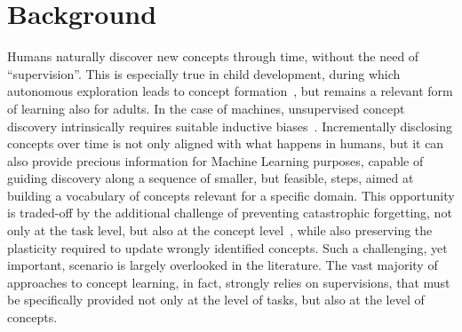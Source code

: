 \section{Background}
%
%
%
Humans naturally discover new concepts through time, without the need of ``supervision''. This is especially true in child development, during which autonomous exploration leads to concept formation~\cite{damon2008child}, but remains a relevant form of learning also for adults.
In the case of machines, unsupervised concept discovery intrinsically requires suitable inductive biases~\cite{locatello2019challenging}. Incrementally disclosing concepts over time is not only aligned with what happens in humans, but it can also provide precious information for Machine Learning purposes, capable of guiding discovery along a sequence of smaller, but feasible, steps, aimed at building a vocabulary of concepts relevant for a specific domain.
This opportunity is traded-off by the additional challenge of preventing catastrophic forgetting, not only at the task level, but also at the concept level~\cite{marconato2023neuro}, while also preserving the plasticity required to update wrongly identified concepts. Such a challenging, yet important, scenario is largely overlooked in the literature.
%
The vast majority of approaches to concept learning, in fact, strongly relies on supervisions, that must be specifically provided not only at the level of tasks, but also at the level of concepts.
